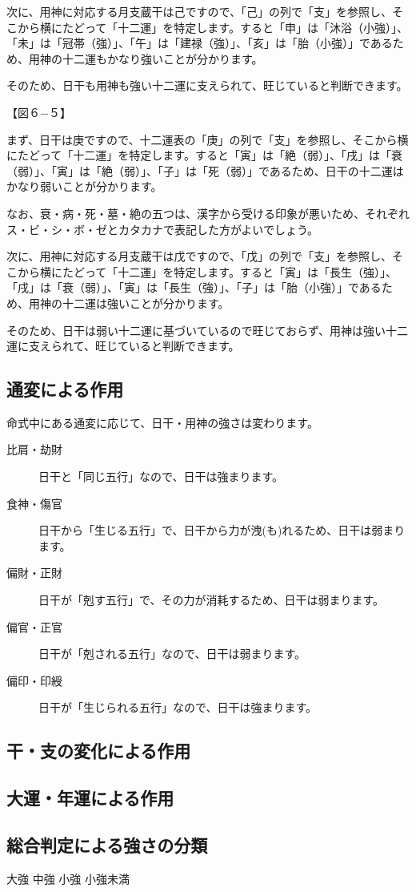 \documentclass[a5paper,11pt,dvipdfmx]{tarticle}
\begin{document}
次に、用神に対応する月支蔵干は己ですので、「己」の列で「支」を参照し、そこから横にたどって「十二運」を特定します。すると「申」は「沐浴（小強）」、「未」は「冠帯（強）」、「午」は「建禄（強）」、「亥」は「胎（小強）」であるため、用神の十二運もかなり強いことが分かります。

そのため、日干も用神も強い十二運に支えられて、旺じていると判断できます。

【図６−５】

まず、日干は庚ですので、十二運表の「庚」の列で「支」を参照し、そこから横にたどって「十二運」を特定します。すると「寅」は「絶（弱）」、「戌」は「衰（弱）」、「寅」は「絶（弱）」、「子」は「死（弱）」であるため、日干の十二運はかなり弱いことが分かります。

なお、衰・病・死・墓・絶の五つは、漢字から受ける印象が悪いため、それぞれス・ビ・シ・ボ・ゼとカタカナで表記した方がよいでしょう。

次に、用神に対応する月支蔵干は戊ですので、「戊」の列で「支」を参照し、そこから横にたどって「十二運」を特定します。すると「寅」は「長生（強）」、「戌」は「衰（弱）」、「寅」は「長生（強）」、「子」は「胎（小強）」であるため、用神の十二運は強いことが分かります。

そのため、日干は弱い十二運に基づいているので旺じておらず、用神は強い十二運に支えられて、旺じていると判断できます。

\subsection{通変による作用}
命式中にある通変に応じて、日干・用神の強さは変わります。

\begin{description}
\item[比肩・劫財] 日干と「同じ五行」なので、日干は強まります。
\item[食神・傷官] 日干から「生じる五行」で、日干から力が洩(も)れるため、日干は弱まります。
\item[偏財・正財] 日干が「剋す五行」で、その力が消耗するため、日干は弱まります。
\item[偏官・正官] 日干が「剋される五行」なので、日干は弱まります。
\item[偏印・印綬] 日干が「生じられる五行」なので、日干は強まります。
\end{description}


\subsection{干・支の変化による作用}


\subsection{大運・年運による作用}


\subsection{総合判定による強さの分類}

大強
中強
小強
小強未満
\end{document}
